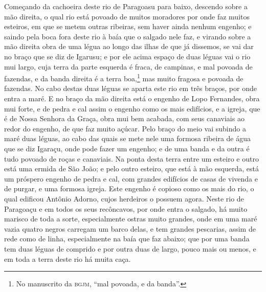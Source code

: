 \begin{linenumbers}
Começando da cachoeira deste rio de Paragoasu para baixo, descendo sobre a mão direita, o
qual rio está povoado de muitos moradores por onde faz muitos esteiros, em que se metem
outras ribeiras, sem haver ainda nenhum engenho; e saindo pela boca fora deste rio à baía
que o salgado nele faz, e virando sobre a mão direita obra de uma légua ao longo das ilhas
de que já dissemos, se vai dar no braço que se diz de Igarusu; e por ele acima espaço de
duas léguas vai o rio mui largo, cuja terra da parte esquerda é fraca, de campinas, e mal
povoada de fazendas, e da banda direita é a terra boa,\footnote{ No manuscrito da
\textsc{bgjm}, ``mal povoada, e da banda''.} mas muito fragosa e povoada de fazendas. No
cabo destas duas léguas se aparta este rio em três braços, por onde entra a maré. E no
braço da mão direita está o engenho de Lopo Fernandes, obra mui forte, e de pedra e cal
assim o engenho como os mais edifícios, e a igreja, que é de Nossa Senhora da Graça, obra
mui bem acabada, com seus canaviais ao redor do engenho, de que faz muito açúcar. Pelo
braço do meio vai subindo a maré duas léguas, ao cabo das quais se mete nele uma formosa
ribeira de água que se diz Igaraçu, onde pode fazer um engenho; e de uma banda e da outra
é tudo povoado de roças e canaviais. Na ponta desta terra entre um esteiro e outro está
uma ermida de São João; e pelo outro esteiro, que está à mão esquerda, está um próspero
engenho de pedra e cal, com grandes edifícios de casas de vivenda e de purgar, e uma
formosa igreja. Este engenho é copioso como os mais do rio, o qual edificou Antônio
Adorno, cujos herdeiros o possuem agora. Neste rio de Paragoaçu e em todos os seus
recôncavos, por onde entra o salgado, há muito marisco de toda a sorte, especialmente
ostras muito grandes, onde em uma maré vazia quatro negros carregam um barco delas, e tem
grandes pescarias, assim de rede como de linha, especialmente na baía que faz abaixo; que
por uma banda tem duas léguas de comprido e por outra duas de largo, pouco mais ou menos,
e em toda a terra deste rio há muita caça.


\end{linenumbers}

